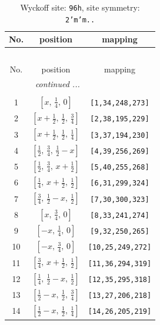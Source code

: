 \documentclass[fleqn,8pt]{jsarticle}
\begin{document}
\begin{longtable}{ccc}
\caption{Wyckoff site: {\tt 96h}, site symmetry: {\tt 2'm'm..}}
 \\
 \hline \hline
No. & position & mapping \\ \hline \endfirsthead

\multicolumn{2}{l}{\tablename\ \thetable{}} \\
 \hline \hline
No. & position & mapping \\ \hline \endhead

 \hline \hline
\multicolumn{2}{r}{\footnotesize\it continued ...} \\ \endfoot

 \hline \hline
\multicolumn{2}{r}{} \\ \endlastfoot

1 & $\left[ x,\, \frac{1}{4},\, 0 \right]$ & {\tt [1,34,248,273]} \\ \hline
2 & $\left[ x + \frac{1}{2},\, \frac{1}{2},\, \frac{3}{4} \right]$ & {\tt [2,38,195,229]} \\ \hline
3 & $\left[ x + \frac{1}{2},\, \frac{1}{2},\, \frac{1}{4} \right]$ & {\tt [3,37,194,230]} \\ \hline
4 & $\left[ \frac{1}{2},\, \frac{3}{4},\, \frac{1}{2} - x \right]$ & {\tt [4,39,256,269]} \\ \hline
5 & $\left[ \frac{1}{2},\, \frac{3}{4},\, x + \frac{1}{2} \right]$ & {\tt [5,40,255,268]} \\ \hline
6 & $\left[ \frac{1}{4},\, x + \frac{1}{2},\, \frac{1}{2} \right]$ & {\tt [6,31,299,324]} \\ \hline
7 & $\left[ \frac{3}{4},\, \frac{1}{2} - x,\, \frac{1}{2} \right]$ & {\tt [7,30,300,323]} \\ \hline
8 & $\left[ x,\, \frac{3}{4},\, 0 \right]$ & {\tt [8,33,241,274]} \\ \hline
9 & $\left[ - x,\, \frac{1}{4},\, 0 \right]$ & {\tt [9,32,250,265]} \\ \hline
10 & $\left[ - x,\, \frac{3}{4},\, 0 \right]$ & {\tt [10,25,249,272]} \\ \hline
11 & $\left[ \frac{3}{4},\, x + \frac{1}{2},\, \frac{1}{2} \right]$ & {\tt [11,36,294,319]} \\ \hline
12 & $\left[ \frac{1}{4},\, \frac{1}{2} - x,\, \frac{1}{2} \right]$ & {\tt [12,35,295,318]} \\ \hline
13 & $\left[ \frac{1}{2} - x,\, \frac{1}{2},\, \frac{3}{4} \right]$ & {\tt [13,27,206,218]} \\ \hline
14 & $\left[ \frac{1}{2} - x,\, \frac{1}{2},\, \frac{1}{4} \right]$ & {\tt [14,26,205,219]} \\ \hline

\end{longtable}
\end{document}
